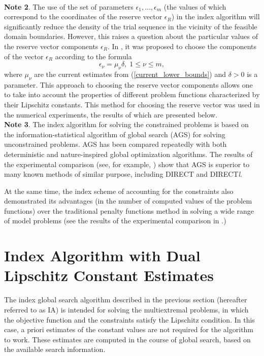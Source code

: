 \documentclass[preprint]{elsarticle}
\begin{document}
\\
\textbf{Note 2}. The use of the set of parameters $\epsilon_1,\ldots,\epsilon_m$ (the values of which correspond to the coordinates of the reserve vector $\epsilon_R$) in the index algorithm will significantly reduce the density of the trial sequence in the vicinity of the feasible domain boundaries. However, this raises a question about the particular values of the reserve vector components $\epsilon_R$. In \cite{Strongin2000}, it was proposed to choose the components of the vector $\epsilon_R$ according to the formula 
\begin{equation}\label{epsilon_nu}
	\epsilon_{\nu} = \mu_{\nu}\delta, \; 1 \leq \nu \leq m, 
\end{equation}
where $\mu_{\nu}$ are the current estimates from (\ref{current_lower_bounds}) and $\delta>0$ is a parameter. This approach to choosing the reserve vector components allows one to take into account the properties of different problem functions characterized by their Lipschitz constants. This method for choosing the reserve vector was used in the numerical experiments, the results of which are presented below.
\\
\textbf{Note 3}. The index algorithm for solving the constrained problems is based on the information-statistical algorithm of global search (AGS) for solving unconstrained problems. AGS has been compared repeatedly with both deterministic and nature-inspired global optimization algorithms. The results of the experimental comparison (see, for example, \cite{Sovrasov2019}) show that AGS is superior to many known methods of similar purpose, including DIRECT and DIRECT\textit{l}.

	At the same time, the index scheme of accounting for the constraints also demonstrated its advantages (in the number of computed values of the problem functions) over the traditional penalty functions method in solving a wide range of model problems (see the results of the experimental comparison in \cite{Barkalov2017_1, Barkalov2017_2}.)



\section{Index Algorithm with Dual Lipschitz Constant Estimates}
	The index global search algorithm described in the previous section (hereafter referred to as IA) is intended for solving  the multiextremal problems, in which the objective function and the constraints satisfy the Lipschitz condition.  In this case, a priori estimates of the constant values are not required for the algorithm to work. These estimates are computed in the course of global search, based on the available search information. 
	
\end{document}
